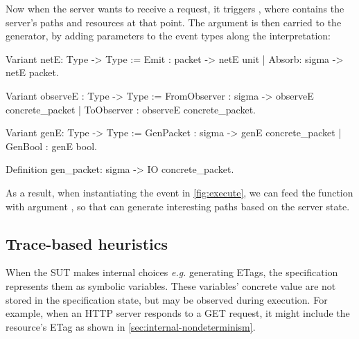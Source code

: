 Now when the server wants to receive a request, it triggers ,
where  contains the server's paths and resources at that
point.  The  argument is then carried to the generator, by adding
parameters to the event types along the interpretation:
\begin{coq}
  Variant netE: Type -> Type :=
    Emit  : packet -> netE unit
  | Absorb: sigma      -> netE packet.

  Variant observeE : Type -> Type :=
    FromObserver   : sigma -> observeE concrete_packet
  | ToObserver     : observeE concrete_packet.

  Variant genE: Type -> Type :=
    GenPacket : sigma -> genE concrete_packet
  | GenBool   : genE bool.

  Definition gen_packet: sigma -> IO concrete_packet.
\end{coq}

As a result, when instantiating the  event in
\autoref{fig:execute}, we can feed the  function with argument
, so that  can generate interesting paths based on the
server state.

\subsection{Trace-based heuristics}
\label{sec:heuristic-trace}

When the SUT makes internal choices {\it e.g.} generating ETags, the
specification represents them as symbolic variables.  These variables' concrete
value are not stored in the specification state, but may be observed during
execution.  For example, when an HTTP server responds to a GET request, it might
include the resource's ETag as shown in \autoref{sec:internal-nondeterminism}.
